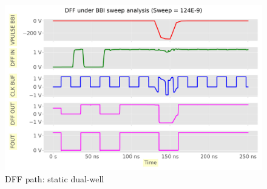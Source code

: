 
\begin{figure}[h]
	\centering
	\includegraphics[width=\columnwidth]{./figures/dff-pdf-dw-neg/anim0114.pdf}
	\caption{DFF path: static dual-well}
	\label{dffstatic-dw}
\end{figure}
